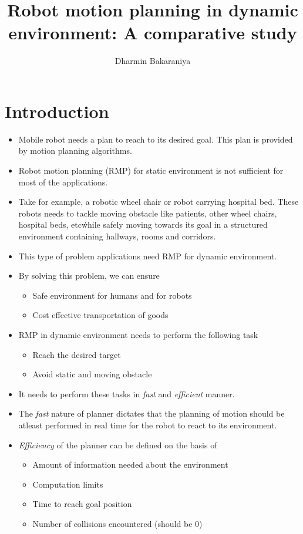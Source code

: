 \documentclass[rnd]{mas_proposal}
\title{Robot motion planning in dynamic environment: A comparative study}
\author{Dharmin Bakaraniya}
\begin{document}
\maketitle

\pagestyle{plain}

\chapter{Introduction}
\begin{itemize}
    \item Mobile robot needs a plan to reach to its desired goal. This plan is provided by motion planning algorithms.
    \item Robot motion planning (RMP) for static environment is not sufficient for most of the applications.
    \item Take for example, a robotic wheel chair or robot carrying hospital bed. These robots needs to tackle moving obstacle like patients, other wheel chairs, hospital beds, etc\. while safely moving towards its goal in a structured environment containing hallways, rooms and corridors.
    \item This type of problem applications need RMP for dynamic environment. 
    \item By solving this problem, we can ensure 
        \begin{itemize}
            \item Safe environment for humans and for robots
            \item Cost effective transportation of goods
        \end{itemize}
    \item RMP in dynamic environment needs to perform the following task
        \begin{itemize}
            \item Reach the desired target
            \item Avoid static and moving obstacle
        \end{itemize}
    \item It needs to perform these tasks in \textit{fast} and \textit{efficient} manner. 
    \item The \textit{fast} nature of planner dictates that the planning of motion should be atleast performed in real time for the robot to react to its environment. 
    \item \textit{Efficiency} of the planner can be defined on the basis of 
        \begin{itemize}
            \item Amount of information needed about the environment
            \item Computation limits
            \item Time to reach goal position
            \item Number of collisions encountered (should be 0)
        \end{itemize}
\end{itemize}
\end{document}

